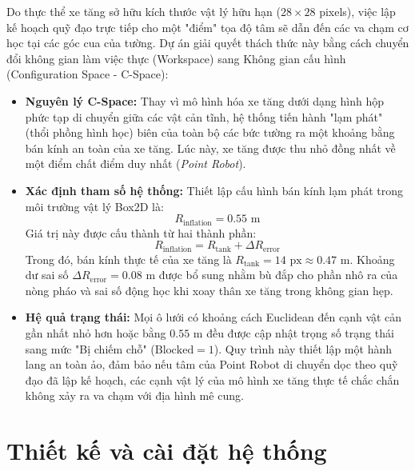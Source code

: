 \documentclass[a4paper, 12pt]{report}
\begin{document}
  Do thực thể xe tăng sở hữu kích thước vật lý hữu hạn ($28 \times 28$ pixels), việc lập kế hoạch quỹ đạo trực tiếp cho một "điểm" tọa độ tâm sẽ dẫn đến các va chạm cơ học tại các góc cua của tường. Dự án giải quyết thách thức này bằng cách chuyển đổi không gian làm việc thực (Workspace) sang Không gian cấu hình (Configuration Space - C-Space):

  \begin{itemize}
      \item \textbf{Nguyên lý C-Space:} Thay vì mô hình hóa xe tăng dưới dạng hình hộp phức tạp di chuyển giữa các vật cản tĩnh, hệ thống tiến hành "lạm phát" (thổi phồng hình học) biên của toàn bộ các bức tường ra một khoảng bằng bán kính an toàn của xe tăng. Lúc này, xe tăng được thu nhỏ đồng nhất về một điểm chất điểm duy nhất (\textit{Point Robot}).
      \item \textbf{Xác định tham số hệ thống:} Thiết lập cấu hình bán kính lạm phát trong môi trường vật lý Box2D là:
      \begin{equation}
      R_{\text{inflation}} = 0.55\text{ m}
      \end{equation}
      Giá trị này được cấu thành từ hai thành phần:
      \begin{equation}
      R_{\text{inflation}} = R_{\text{tank}} + \Delta R_{\text{error}}
      \end{equation}
      Trong đó, bán kính thực tế của xe tăng là $R_{\text{tank}} = 14\text{ px} \approx 0.47\text{ m}$. Khoảng dư sai số $\Delta R_{\text{error}} = 0.08\text{ m}$ được bổ sung nhằm bù đắp cho phần nhô ra của nòng pháo và sai số động học khi xoay thân xe tăng trong không gian hẹp.
      \item \textbf{Hệ quả trạng thái:} Mọi ô lưới có khoảng cách Euclidean đến cạnh vật cản gần nhất nhỏ hơn hoặc bằng $0.55\text{ m}$ đều được cập nhật trọng số trạng thái sang mức "Bị chiếm chỗ" ($\text{Blocked} = 1$). Quy trình này thiết lập một hành lang an toàn ảo, đảm bảo nếu tâm của Point Robot di chuyển dọc theo quỹ đạo đã lập kế hoạch, các cạnh vật lý của mô hình xe tăng thực tế chắc chắn không xảy ra va chạm với địa hình mê cung.
  \end{itemize}

  \chapter{Thiết kế và cài đặt hệ thống}
\end{document}
